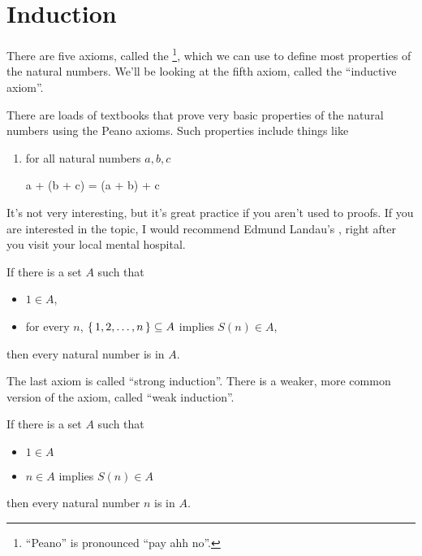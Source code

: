 \section{Induction}

There are five axioms, called the \footnote{``Peano'' is pronounced ``pay ahh no''.}, which we
can use to define most properties of the natural numbers. We'll be
looking at the fifth axiom, called the ``inductive axiom''.

\begin{aside}
  There are loads of textbooks that prove very basic properties of the
  natural numbers using the Peano axioms. Such properties include
  things like

  \begin{enumerate}
  \item for all natural numbers $a, b, c$

    \begin{zz}
      a + (b + c) = (a + b) + c
    \end{zz}
  \end{enumerate}

  It's not very interesting, but it's great practice if you aren't
  used to proofs. If you are interested in the topic, I would
  recommend Edmund Landau's 
  \cite{landau}, right after you visit your local mental hospital.
\end{aside}

\begin{definition}
  \label{def:strong-induction}
  If there is a set $A$ such that
    \begin{itemize}
    \item $1 \in A$,
    \item for every $n$, $\left\{ \, 1, 2, \dots, n \, \right\} \subseteq A$ implies
      $S(n) \in A$,
    \end{itemize}

    then every natural number is in $A$.
\end{definition}

The last axiom is called ``strong induction''. There is a weaker, more
common version of the axiom, called ``weak induction''.

\begin{definition}
  \label{def:weak-induction}
  If there is a set $A$ such that

  \begin{itemize}
  \item $1 \in A$
  \item $n \in A$ implies $S(n) \in A$
  \end{itemize}

  then every natural number $n$ is in $A$.
\end{definition}

